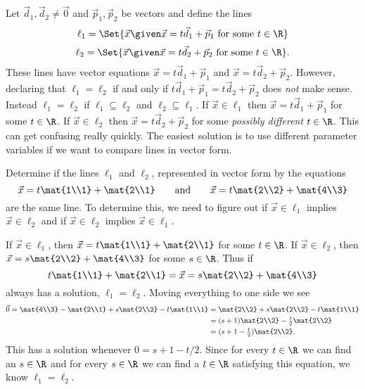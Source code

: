 \bigskip
Let $\vec d_1,\vec d_2\neq\vec 0$ and $\vec p_1,\vec p_2$ be vectors and define the lines
\[
	\ell_1=\Set{\vec x\given \vec x=t\vec d_1+\vec p_1\text{ for some }t\in\R}
\]
\[
	\ell_2=\Set{\vec x\given \vec x=t\vec d_2+\vec p_2\text{ for some }t\in\R}.
\]
These lines have vector equations $\vec x=t\vec d_1+\vec p_1$ and $\vec x=t\vec d_2+\vec p_2$.
However, declaring that $\ell_1=\ell_2$ if and only if $t\vec d_1+\vec p_1=t\vec d_2+\vec p_2$
does \emph{not} make sense.   Instead $\ell_1=\ell_2$ if $\ell_1\subseteq\ell_2$ and $\ell_2\subseteq\ell_1$.
If $\vec x\in\ell_1$ then $\vec x=t\vec d_1+\vec p_1$ for some $t\in\R$.  If $\vec x\in\ell_2$
then $\vec x=t\vec d_2+\vec p_2$ for some \emph{possibly different} $t\in \R$.  This can get
confusing really quickly.  The easiest solution is to use different parameter variables if
we want to compare lines in vector form.

\begin{example}
	Determine if the lines $\ell_1$ and $\ell_2$, represented in vector form by the equations
	\[
		\vec x=t\mat{1\\1}+\mat{2\\1}\qquad\text{and}\qquad
		\vec x=t\mat{2\\2}+\mat{4\\3}
	\]
	are the same line.  To determine this, we need to figure out if $\vec x\in\ell_1$
	implies $\vec x\in \ell_2$ and if $\vec x\in\ell_2$ implies $\vec x\in\ell_1$.

	If $\vec x\in\ell_1$, then $\vec x=t\mat{1\\1}+\mat{2\\1}$ for some $t\in\R$.  If
	$\vec x\in\ell_2$, then $\vec x=s\mat{2\\2}+\mat{4\\3}$ for some $s\in \R$.  Thus if
	\[
		t\mat{1\\1}+\mat{2\\1} = \vec x = s\mat{2\\2}+\mat{4\\3}
	\]
	always has a solution, $\ell_1=\ell_2$.  Moving everything to one side we see
	\begin{align*}
		\vec 0 = \mat{4\\3}-\mat{2\\1} + s\mat{2\\2}-t\mat{1\\1}
		&=\mat{2\\2}+s\mat{2\\2}-t\mat{1\\1}\\
		&=(s+1)\mat{2\\2}-\tfrac{t}{2}\mat{2\\2}\\
		&= (s+1-\tfrac{t}{2})\mat{2\\2}.
	\end{align*}
	This has a solution whenever $0=s+1-t/2$.  Since for every $t\in\R$ we can find an $s\in\R$
	and for every $s\in \R$ we can find a $t\in \R$ satisfying this equation, we know $\ell_1=\ell_2$.
\end{example}


